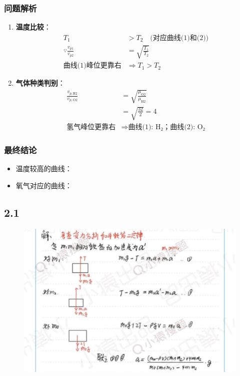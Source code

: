 \documentclass{article}
\begin{document}
{\subsubsection*{问题解析}
\begin{enumerate}
    \item \textbf{温度比较}：
    \begin{align*}
        T_1 &> T_2 \quad \text{(对应曲线(1)和(2))} \\
        \because \frac{v_{p1}}{v_{p2}} &= \sqrt{\frac{T_1}{T_2}} \\
        \text{曲线(1)峰位更靠右} &\Rightarrow T_1 > T_2
    \end{align*}
    
    \item \textbf{气体种类判别}：
    \begin{align*}
        \frac{v_{p,\text{H2}}}{v_{p,\text{O2}}} &= \sqrt{\frac{\mu_{\text{O2}}}{\mu_{\text{H2}}}} \\
        &= \sqrt{\frac{32}{2}} = 4 \\
        \text{氢气峰位更靠右} &\Rightarrow \text{曲线(1): H₂；曲线(2): O₂}
    \end{align*}
\end{enumerate}

\subsubsection*{最终结论}
\begin{itemize}
    \item 温度较高的曲线：
    \item 氧气对应的曲线：
\end{itemize}


\subsection*{2.1}

\begin{figure}[H]
    \centering
    \includegraphics[width=1\linewidth]{微信图片_20250416153242.jpg}
\end{figure}


}
\end{document}
